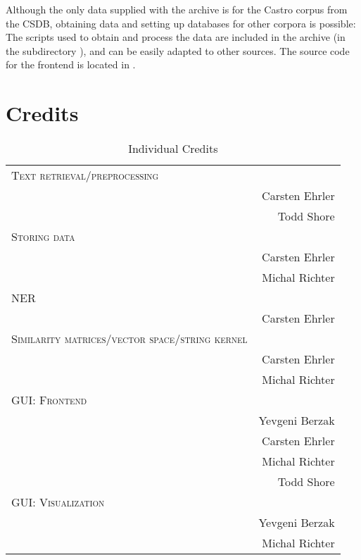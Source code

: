 Although the only data supplied with the archive is for the Castro corpus from the CSDB, obtaining
data and setting up databases for other corpora is possible: The scripts used to obtain and
process the data are included in the archive (in the subdirectory ), and can be easily
adapted to other sources. The source code for the frontend is located in .

\section{Credits}
\begin{table}[ht]
\centering
\caption{Individual Credits}
\begin{tabular}{l r}
\toprule
  	\textsc{Text retrieval/preprocessing} &  \\
  		& Carsten Ehrler \\
 		& Todd Shore \\
  	\textsc{Storing data} & \\
  		& Carsten Ehrler \\ 
  		& Michal Richter \\
	\textsc{NER} & \\
		& Carsten Ehrler \\
	\textsc{Similarity matrices/vector space/string kernel} & \\
		& Carsten Ehrler \\
		& Michal Richter \\
	\textsc{GUI: Frontend} & \\
		& Yevgeni Berzak \\
  		& Carsten Ehrler \\
		& Michal Richter \\
		& Todd Shore \\
	\textsc{GUI: Visualization} & \\
		& Yevgeni Berzak \\
		& Michal Richter \\
  \bottomrule
\end{tabular}
\end{table}
